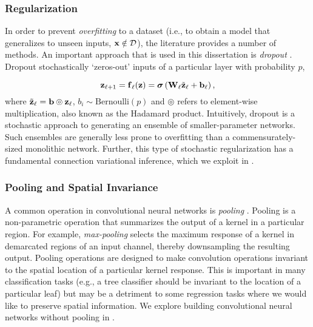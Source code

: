 \subsubsection{Regularization}

In order to prevent \textit{overfitting} to a dataset (i.e., to obtain a model that generalizes to unseen inputs, $\boldsymbol{\mathbf{x}} \notin \mathcal{D}$), the literature provides a number of methods. An important approach that is used in this dissertation is \textit{dropout} \citep{srivastava_dropout_2014}. Dropout stochastically `zeros-out' inputs of a particular layer with probability $p$, 

\begin{equation}
	\boldsymbol{\mathbf{z}}_{\ell+1} = \boldsymbol{\mathbf{f}}_\ell(\boldsymbol{\mathbf{z}}) = \boldsymbol{\mathbf{\sigma}}\left(\boldsymbol{\mathbf{W}}_\ell\tilde{\boldsymbol{\mathbf{z}}}_\ell + \boldsymbol{\mathbf{b}}_\ell\right),
\end{equation}
where $\tilde{\boldsymbol{\mathbf{z}}}_\ell = \boldsymbol{\mathbf{b}} \circledcirc \boldsymbol{\mathbf{z}}_\ell$, $b_i \sim \text{Bernoulli}(p)$ and $\circledcirc$ refers to element-wise multiplication, also known as the Hadamard product. Intuitively, dropout is a stochastic approach to generating an ensemble of smaller-parameter networks. Such ensembles are generally less prone to overfitting than a commensurately-sized monolithic network. Further, this type of stochastic regularization has a fundamental connection variational inference, which we exploit in .
\subsubsection{Pooling and Spatial Invariance}
A common operation in convolutional neural networks is \textit{pooling} \citep{Goodfellow-et-al-2016}. Pooling is a non-parametric operation that summarizes the output of a kernel in a particular region. For example, \textit{max-pooling} selects the maximum response of a kernel in demarcated regions of an input channel, thereby downsampling the resulting output. Pooling operations are designed to make convolution operations invariant to the spatial location of a particular kernel response. This is important in many classification tasks (e.g., a tree classifier should be invariant to the location of a particular leaf) but may be a detriment to some regression tasks where we would like to preserve spatial information. We explore building convolutional neural networks without pooling in .



 